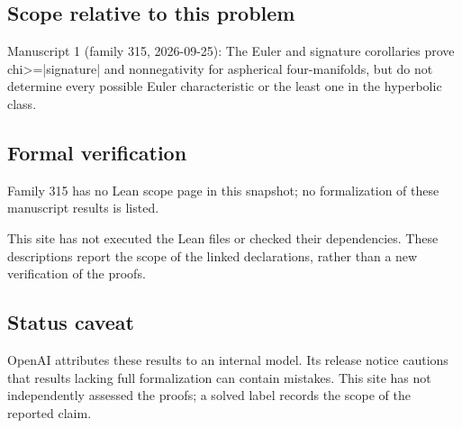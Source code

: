 \documentclass[11pt]{article}
\begin{document}
\subsection{Scope relative to this problem}
Manuscript 1 (family 315, 2026-09-25): The Euler and signature corollaries prove chi>=|signature| and nonnegativity for aspherical four-manifolds, but do not determine every possible Euler characteristic or the least one in the hyperbolic class.

\subsection{Formal verification}
Family 315 has no Lean scope page in this snapshot; no formalization of these manuscript results is listed.

This site has not executed the Lean files or checked their dependencies. These descriptions report the scope of the linked declarations, rather than a new verification of the proofs.

\subsection{Status caveat}
OpenAI attributes these results to an internal model. Its release notice cautions that results lacking full formalization can contain mistakes. This site has not independently assessed the proofs; a solved label records the scope of the reported claim.
\end{document}
